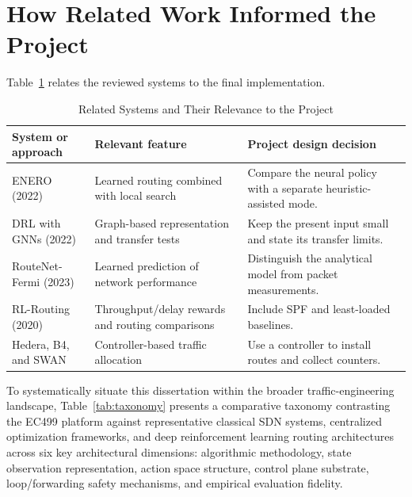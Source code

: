 \documentclass[12pt,a4paper,oneside]{report}
\begin{document}
\section{How Related Work Informed the Project}
Table~\ref{tab:related_work} relates the reviewed systems to the final implementation.

\begin{table}[htbp]
\centering
\caption{Related Systems and Their Relevance to the Project}
\label{tab:related_work}
\small
\begin{tabularx}{\textwidth}{p{3.0cm} >{\raggedright\arraybackslash}X >{\raggedright\arraybackslash}X}
\toprule
System or approach & Relevant feature & Project design decision \\
\midrule
ENERO (2022) & Learned routing combined with local search & Compare the neural policy with a separate heuristic-assisted mode. \\
DRL with GNNs (2022) & Graph-based representation and transfer tests & Keep the present input small and state its transfer limits. \\
RouteNet-Fermi (2023) & Learned prediction of network performance & Distinguish the analytical model from packet measurements. \\
RL-Routing (2020) & Throughput/delay rewards and routing comparisons & Include SPF and least-loaded baselines. \\
Hedera, B4, and SWAN & Controller-based traffic allocation & Use a controller to install routes and collect counters. \\
\bottomrule
\end{tabularx}
\end{table}

To systematically situate this dissertation within the broader traffic-engineering landscape, Table~\ref{tab:taxonomy} presents a comparative taxonomy contrasting the EC499 platform against representative classical SDN systems, centralized optimization frameworks, and deep reinforcement learning routing architectures across six key architectural dimensions: algorithmic methodology, state observation representation, action space structure, control plane substrate, loop/forwarding safety mechanisms, and empirical evaluation fidelity.
\end{document}
